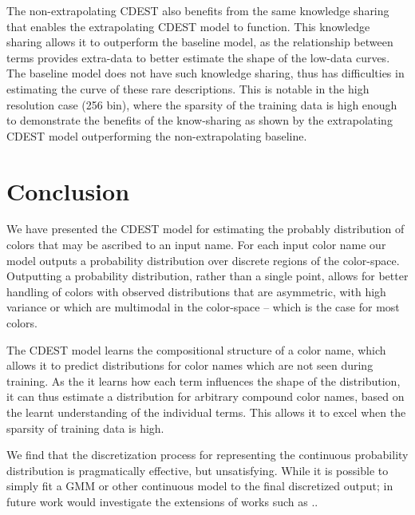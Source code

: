 \documentclass[11pt,a4paper]{article}
\newcommand{\textcite}{\citet}
\begin{document}
The non-extrapolating CDEST also benefits from the same knowledge sharing that enables the extrapolating CDEST model to function.
This knowledge sharing allows it to outperform the baseline model, as the relationship between terms provides extra-data to better estimate the shape of the low-data curves.
The baseline model does not have such knowledge sharing, thus has difficulties in estimating  the curve of these rare descriptions.
This is notable in the high resolution case (256 bin),
where the sparsity of the training data is high enough to demonstrate the benefits of the know-sharing as shown by the extrapolating CDEST model outperforming the non-extrapolating baseline.




\section{Conclusion}\label{sec:conclusion}
We have presented the CDEST model for estimating the probably distribution of colors that may be ascribed to an input name.
For each input color name our model outputs a probability distribution over discrete regions of the color-space.
Outputting a probability distribution, rather than a single point, allows for better handling of colors with observed distributions that are asymmetric, with high variance or which are multimodal in the color-space -- which is the case for most colors.

The CDEST model learns the compositional structure of a color name, which allows it to predict distributions for color names which are not seen during training.
As the it learns how each term influences the shape of the distribution, it can thus estimate a distribution for
arbitrary compound color names, based on the learnt understanding of the individual terms.
This allows it to excel when the sparsity of training data is high.

We find that the discretization process for representing the continuous probability distribution is pragmatically effective, but unsatisfying.
While it is possible to simply fit a GMM or other continuous model to the final discretized output;
in future work would investigate the extensions of works such as \textcite{1998NNpdfDiffCdf, likas2001probability, 2017arXivKernalMixtureNetworks}..



\clearpage


%
\end{document}
